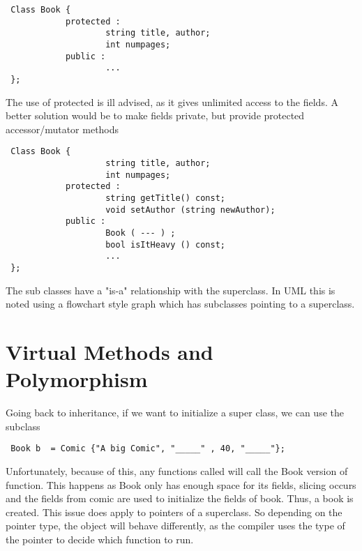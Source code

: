 \documentclass{article}
\begin{document}
 \begin{lstlisting}
 Class Book {
 			protected : 
 					string title, author; 
 					int numpages; 
 			public : 
 					...
 }; 
 \end{lstlisting}
 
 The use of protected is ill advised, as it gives unlimited access to the fields. A better solution would be to make fields private, but provide protected accessor/mutator methods 
 
 \begin{lstlisting}
 Class Book {
 					string title, author; 
 					int numpages; 
 			protected :
 					string getTitle() const;
 					void setAuthor (string newAuthor);
 			public : 
					Book ( --- ) ; 
					bool isItHeavy () const; 					
 					...
 }; 
 \end{lstlisting}
 
 The sub classes have a "is-a" relationship with the superclass.
 In UML this is noted using a flowchart style graph which has subclasses pointing to a superclass. 
 
 \begin{center}
\end{center}

 
 \section{Virtual Methods and Polymorphism}
 Going back to inheritance, if we want to initialize a super class, we can use the subclass
 \begin{lstlisting}
 Book b  = Comic {"A big Comic", "_____" , 40, "_____"};
 \end{lstlisting} 
 Unfortunately, because of this, any functions called will call the Book version of function. This happens as Book only has enough space for its fields, slicing occurs and the fields from comic are used to initialize the fields of book. Thus, a book is created.  This issue does apply to pointers of a superclass. So depending on the pointer type, the object will behave differently, as the compiler uses the type of the pointer to decide which function to run.  
\end{document}
